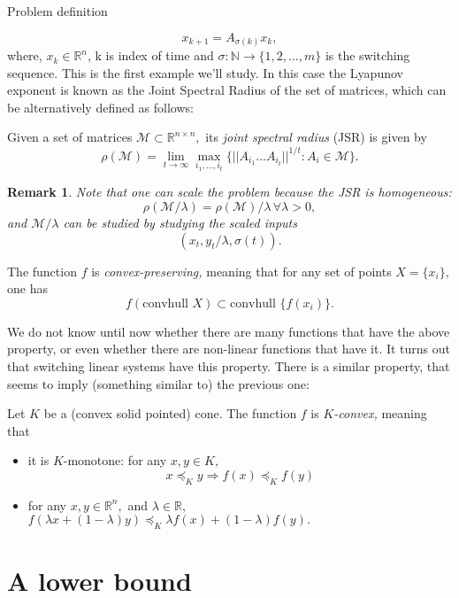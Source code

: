 \documentclass[letterpaper,11pt]{paper}
\newcommand{\convhull}{\mbox{convhull } }
\newcommand{\R}{\mathbb{R} }
\newcommand{\N}{\mathbb{N} }
\newcommand{\conv}{\convhull }
\newcommand{\re}{\mathbb{R}}
\newcommand{\cM}{\mathcal{M}}
\newtheorem{remark}{Remark}[section]
\newtheorem{}{Property}[section]
\newenvironment{definition}[1][Definition]{\begin{trivlist}
\item[\hskip \labelsep {\bfseries #1}]}{\end{trivlist}}
\begin{document}
\begin{section}{Problem definition}
\begin{property}
\begin{equation}\label{switchedSystem}x_{k+1} = A_{\sigma(k)}x_k,
\end{equation}
where, $x_k \in \R^n$, k is index of time and $\sigma: \N \to \{1,2, \ldots, m\}$ is the switching sequence.  This is the first example we'll study.
In this case the Lyapunov exponent is known as the Joint Spectral Radius of the set of matrices, which can be alternatively defined as follows:
\begin{definition}  \cite{jungers_lncis} Given a set of matrices $\cM \subset \re^{n\times n},$ its \emph{joint spectral radius} (JSR) is given by
$$\rho(\cM) =\lim_{t\rightarrow \infty} \max_{i_1,\dots, i_t}\{||A_{i_1} \dots A_{i_t}||^{1/t}: A_i\in\cM\}. $$
\end{definition}
\begin{remark}
 Note that one can scale the problem because the JSR is homogeneous:
$$\rho(\cM/\lambda)=\rho(\cM)/\lambda\, \forall \lambda>0, $$ and $\cM/\lambda$ can be studied by studying the scaled inputs $$(x_t, y_t/\lambda,\sigma(t)).$$
\end{remark}
\end{property}
\begin{property}\label{property:convpres}
 The function $f$ is \emph{convex-preserving,} meaning that for any set of points $X=\{x_i\},$ one has
$$ f(\conv{X})\subset \conv\{f(x_i)\}. $$
\end{property}
We do not know until now whether there are many functions that have the above property, or even whether there are non-linear functions that have it. It turns out that switching linear systems have this property. There is a similar property, that seems to imply (something similar to) the previous one:
\begin{property}\label{property:kconvexity} \cite{VaB:96}Let $K$ be a (convex solid pointed) cone. The function $f$ is \emph{$K$-convex,}  meaning that \begin{itemize} \item it is $K$-monotone: for any $x,y\in K,$ $$x\preceq_K y \Rightarrow f( x )\preceq_K  f(y)$$ \item for any $x,y\in \re^n,$ and $\lambda \in \re,$ $f(\lambda x + (1-\lambda)y)\preceq_K \lambda f(x) + (1-\lambda)f(y).$ \end{itemize}
\end{property}

\end{section}

\section{A lower bound}
\end{document}
